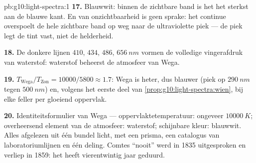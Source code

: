 \begin{solution}{pb:g10:light-spectra:1}
\textbf{17.} Blauwwit: binnen de zichtbare band is het  het
sterkst aan de blauwe kant. En van onzichtbaarheid is geen sprake: het
continue  overspoelt de hele zichtbare band op weg naar de
ultraviolette piek --- de piek legt de tint vast, niet de helderheid.

\textbf{18.} De donkere lijnen $410$, $434$, $486$, $\qty{656}{nm}$
vormen de volledige vingerafdruk van waterstof: waterstof beheerst de
atmosfeer van Wega.

\textbf{19.} $T_{\text{Wega}} / T_{\text{Zon}} = 10000 / 5800 \approx
1.7$: Wega is heter, dus blauwer (piek op $\qty{290}{nm}$ tegen
$\qty{500}{nm}$) en, volgens het eerste deel van
\cref{prop:g10:light-spectra:wien}, bij elke  feller per
 gloeiend oppervlak.

\textbf{20.} Identiteitsformulier van Wega ---
oppervlaktetemperatuur: ongeveer $\qty{10000}{K}$; overheersend element
van de atmosfeer: waterstof; schijnbare kleur: blauwwit. Alles afgelezen
uit één bundel licht, met een prisma, een catalogus van
laboratoriumlijnen en één deling. Comtes ``nooit'' werd in 1835
uitgesproken en verliep in 1859: het heeft vierentwintig jaar geduurd.
\end{solution}
